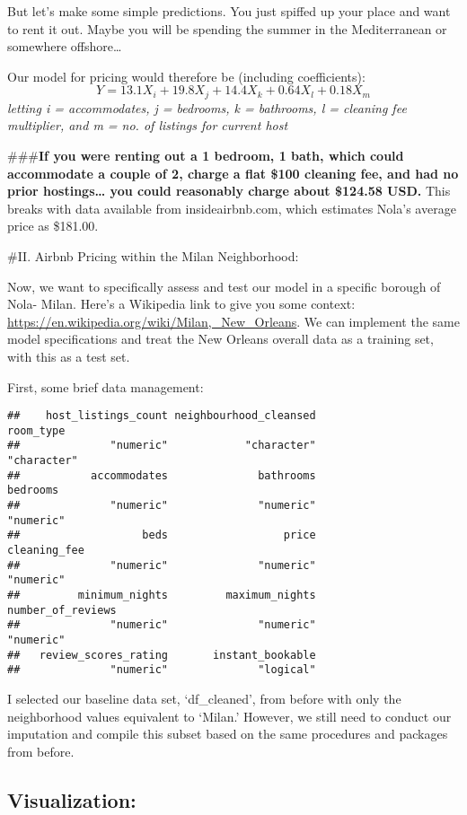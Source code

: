 \documentclass[]{article}
\begin{document}
But let's make some simple predictions. You just spiffed up your place
and want to rent it out. Maybe you will be spending the summer in the
Mediterranean or somewhere offshore\ldots{}

Our model for pricing would therefore be (including coefficients):
\[Y = 13.1X_i + 19.8X_j + 14.4X_k + 0.64X_l + 0.18X_m\] \emph{letting i
= accommodates, j = bedrooms, k = bathrooms, l = cleaning fee
multiplier, and m = no. of listings for current host}

\#\#\#\textbf{If you were renting out a 1 bedroom, 1 bath, which could
accommodate a couple of 2, charge a flat \$100 cleaning fee, and had no
prior hostings\ldots{} you could reasonably charge about \$124.58 USD.}
This breaks with data available from insideairbnb.com, which estimates
Nola's average price as \$181.00.

\#II. Airbnb Pricing within the Milan Neighborhood:

Now, we want to specifically assess and test our model in a specific
borough of Nola- Milan. Here's a Wikipedia link to give you some
context: \url{https://en.wikipedia.org/wiki/Milan,_New_Orleans}. We can
implement the same model specifications and treat the New Orleans
overall data as a training set, with this as a test set.

First, some brief data management:

\begin{verbatim}
##    host_listings_count neighbourhood_cleansed              room_type 
##              "numeric"            "character"            "character" 
##           accommodates              bathrooms               bedrooms 
##              "numeric"              "numeric"              "numeric" 
##                   beds                  price           cleaning_fee 
##              "numeric"              "numeric"              "numeric" 
##         minimum_nights         maximum_nights      number_of_reviews 
##              "numeric"              "numeric"              "numeric" 
##   review_scores_rating       instant_bookable 
##              "numeric"              "logical"
\end{verbatim}

I selected our baseline data set, `df\_cleaned', from before with only
the neighborhood values equivalent to `Milan.' However, we still need to
conduct our imputation and compile this subset based on the same
procedures and packages from before.

\hypertarget{visualization}{%
\subsection{Visualization:}\label{visualization}}
\end{document}
